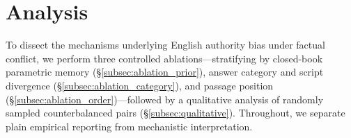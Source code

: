 \section{Analysis}
\label{sec:analysis}

To dissect the mechanisms underlying English authority bias under factual conflict, we perform three controlled ablations---stratifying by closed-book parametric memory (\S\ref{subsec:ablation_prior}), answer category and script divergence (\S\ref{subsec:ablation_category}), and passage position (\S\ref{subsec:ablation_order})---followed by a qualitative analysis of randomly sampled counterbalanced pairs (\S\ref{subsec:qualitative}). Throughout, we separate plain empirical reporting from mechanistic interpretation.

\begin{table}[b]
\centering
\scriptsize
\renewcommand{\arraystretch}{0.88}
\caption{Ablation by passage order ($M{=}300$ pairs per order). Recency bias toward $D_2$ compounds with English preference under \texttt{KO-first} ($D_2{=}\text{EN}$) and opposes it under \texttt{EN-first} ($D_2{=}\text{KO}$).}
\label{tab:ablation_order}
\end{table}

